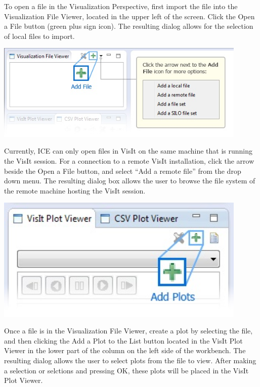 To open a file in the Visualization Perspective, first import the file into the
Visualization File Viewer, located in the upper left of the screen. Click the
Open a File button (green plus sign icon). The resulting dialog allows for the
selection of local files to import.

\begin{center}
\includegraphics[width=12cm]{images/VisualizationAddFile}
\end{center}

Currently, ICE can only open files in VisIt on the same machine that is running
the VisIt session. For a connection to a remote VisIt installation, click the
arrow beside the Open a File button, and select ``Add a remote file'' from the
drop down menu. The resulting dialog box allows the user to browse the file
system of the remote machine hosting the VisIt session.

\begin{center}
\includegraphics[width=12cm]{images/VisualizationAddPlots}
\end{center}

Once a file is in the Visualization File Viewer, create a plot by selecting the
file, and then clicking the Add a Plot to the List button located in the VisIt
Plot Viewer in the lower part of the column on the left side of the workbench.
The resulting dialog allows the user to select plots from the file to view.
After making a selection or selctions and pressing OK, these plots will be
placed in the VisIt Plot Viewer.

